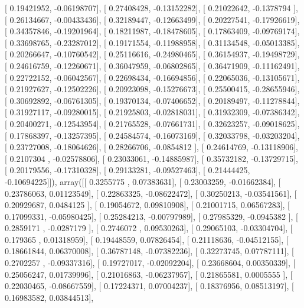 \documentclass{article}
\begin{document}
       [ 0.19421952, -0.06198707],
       [ 0.27408428, -0.13152282],
       [ 0.21022642, -0.1378794 ],
       [ 0.26134667, -0.00433436],
       [ 0.32189447, -0.12663499],
       [ 0.20227541, -0.17926619],
       [ 0.34357846, -0.19201964],
       [ 0.18211987, -0.18478605],
       [ 0.17863409, -0.09769174],
       [ 0.33698765, -0.23287012],
       [ 0.19171554, -0.11988958],
       [ 0.31134548, -0.05013385],
       [ 0.20266647, -0.10760542],
       [ 0.25116616, -0.24980465],
       [ 0.36154937, -0.19498729],
       [ 0.24616759, -0.12260671],
       [ 0.36047959, -0.06802865],
       [ 0.36471909, -0.11162491],
       [ 0.22722152, -0.06042567],
       [ 0.22698434, -0.16694856],
       [ 0.22065036, -0.13105671],
       [ 0.21927627, -0.12502226],
       [ 0.20923098, -0.15276673],
       [ 0.25500415, -0.28655946],
       [ 0.30692892, -0.06761305],
       [ 0.19370134, -0.07406652],
       [ 0.20189497, -0.11278844],
       [ 0.31927117, -0.09280015],
       [ 0.21925803, -0.02818031],
       [ 0.31932309, -0.07386342],
       [ 0.20400271, -0.12543954],
       [ 0.21765528, -0.07661731],
       [ 0.32623257, -0.09018625],
       [ 0.17868397, -0.13257395],
       [ 0.24584574, -0.16073169],
       [ 0.32033798, -0.03203204],
       [ 0.23727008, -0.18064626],
       [ 0.28266706, -0.0854812 ],
       [ 0.24614769, -0.13118906],
       [ 0.2107304 , -0.02578806],
       [ 0.23033061, -0.14885987],
       [ 0.35732182, -0.13729715],
       [ 0.20179556, -0.17310328],
       [ 0.29133281, -0.09527463],
       [ 0.21444425, -0.10694225]]), array([[ 0.3255775 ,  0.07383631],
       [ 0.23003259, -0.01662384],
       [ 0.23786063,  0.01123549],
       [ 0.22863325, -0.08622472],
       [ 0.30250213, -0.03541561],
       [ 0.20929687,  0.0484125 ],
       [ 0.19054672,  0.09810908],
       [ 0.21001715,  0.06567283],
       [ 0.17099331, -0.05980425],
       [ 0.25284213, -0.00797989],
       [ 0.27985329, -0.0945382 ],
       [ 0.2859171 , -0.0287179 ],
       [ 0.2746072 ,  0.09530263],
       [ 0.29065103, -0.03304704],
       [ 0.179365  ,  0.01318959],
       [ 0.19448559,  0.07826454],
       [ 0.21118636, -0.04512155],
       [ 0.18661844,  0.06370008],
       [ 0.36787148, -0.07382236],
       [ 0.32273745,  0.07787111],
       [ 0.2702257 , -0.09337316],
       [ 0.19727017, -0.02092204],
       [ 0.23668604,  0.00350339],
       [ 0.25056247,  0.01739996],
       [ 0.21016863, -0.06237957],
       [ 0.21865581,  0.0005555 ],
       [ 0.22030465, -0.08667559],
       [ 0.17224371,  0.07004237],
       [ 0.18376956,  0.08513197],
       [ 0.16983582,  0.03844513],
\end{document}
